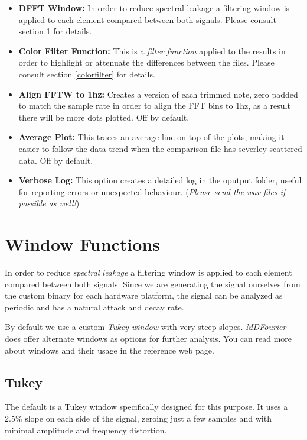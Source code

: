 \documentclass[10pt,a4paper]{report}
\begin{document}
\begin{itemize}
	\item \textbf{DFFT Window:} In order to reduce spectral leakage a filtering window is applied to each element compared between both signals. Please consult section \ref{windows} for details. 
	\item \textbf{Color Filter Function:} This is a \textit{filter function} applied to the results in order to highlight or attenuate the differences between the files.  Please consult section \ref{colorfilter} for details. 
	\item \textbf{Align FFTW to 1hz:} Creates a version of each trimmed note, zero padded to match the sample rate in order to align the FFT bins to 1hz, as a  result there will be more dots plotted. Off by default.
	\item \textbf{Average Plot:} This traces an average line on top of the plots, making it easier to follow the data trend when the comparison file has severley scattered data. Off by default.
	\item \textbf{Verbose Log:} This option creates a detailed log in the oputput folder, useful for reporting errors or unexpected behaviour. (\textit{Please send the wav files if possible as well!})
\end{itemize}

\section{Window Functions}
\label{windows}

In order to reduce \textit{spectral leakage} a filtering window is applied to each element compared between both signals. Since we are generating the signal ourselves from the custom binary for each hardware platform, the signal can be analyzed as periodic and has a natural attack and decay rate.

By default we use a custom \textit{Tukey window} with very steep slopes. \textit{MDFourier} does offer alternate windows as options for further analysis. You can read more about windows and their usage in the reference web page\cite{windowtypes}.

\subsection{Tukey}

The default is a Tukey window specifically designed for this purpose. It uses a 2.5\% slope on each side of the signal, zeroing just a few samples and with minimal amplitude and frequency distortion.
\end{document}
